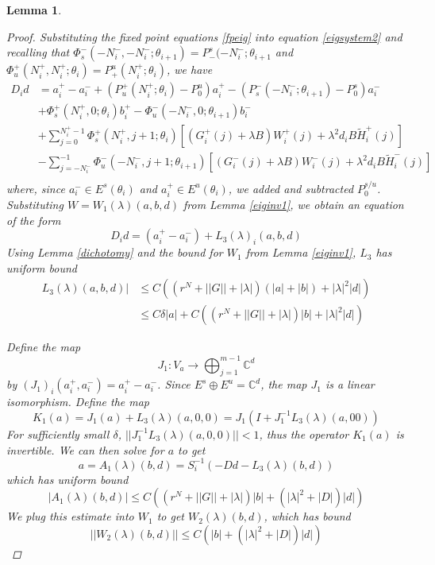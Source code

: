 \documentclass[12pt]{article}
\def\C{{\mathbb C}}
\newtheorem{lemma}{Lemma}
\begin{document}
\begin{lemma}
\begin{proof}
Substituting the fixed point equations \eqref{fpeig} into equation \eqref{eigsystem2} and recalling that $\Phi_s^-(-N_i^-, -N_i^-; \theta_{i+1}) = P_-^s(-N_i^-; \theta_{i+1}$ and $\Phi_u^+(N_i^+, N_i^+; \theta_i) = P_+^u(N_i^+; \theta_{i})$, we have
\begin{align}
D_i d &= a_i^+ - a_i^- + (P_u^+(N_i^+; \theta_i) - P_0^u) a_i^+ - (P_s^-(-N_i^-; \theta_{i+1}) - P_0^s) a_i^- \\
&+ \Phi_s^+(N_i^+, 0; \theta_i) b_i^+ - \Phi_u^-(-N_i^-, 0; \theta_{i+1}) b_i^- \nonumber \\
&+ \sum_{j = 0}^{N_i^+-1} \Phi_s^+(N_i^+, j+1; \theta_i) 
[(G_i^+(j) + \lambda B) W_i^+(j) + \lambda^2 d_i B \tilde{H}_i^+(j)] \nonumber \\
&- \sum_{j = -N_i^-}^{-1} \Phi_u^-(-N_i^-, j+1; \theta_{i+1}) 
[(G_i^-(j) + \lambda B) W_i^-(j) + \lambda^2 d_i B \tilde{H}_i^-(j)] \nonumber \\
\end{align}
where, since $a_i^- \in E^s(\theta_i)$ and $a_i^+ \in E^u(\theta_i)$, we added and subtracted $P_0^{s/u}$. Substituting $W = W_1(\lambda)(a, b, d)$ from Lemma \ref{eiginv1}, we obtain an equation of the form 
\begin{equation}\label{Dideq}
D_i d = (a_i^+ - a_i^-) + L_3(\lambda)_i(a,b,d)
\end{equation}
Using Lemma \ref{dichotomy} and the bound for $W_1$ from Lemma \ref{eiginv1}, $L_3$ has uniform bound
\begin{align}\label{L3bound}
L_3(\lambda)(a,b,d)| &\leq C\left( (r^N + ||G|| + |\lambda| ) (|a| + |b|) + |\lambda|^2 |d|  \right) \\
&\leq C \delta |a| + C\left( (r^N + ||G|| + |\lambda| ) |b| + |\lambda|^2 |d|  \right) \nonumber
\end{align}

Define the map
\[
J_1: V_a \rightarrow \bigoplus_{j=1}^{m-1} \C^d
\]
by $(J_1)_i(a_i^+, a_i^-) = a_i^+ - a_i^-$. Since $E^s \oplus E^u = \C^d$, the map $J_1$ is a linear isomorphism. Define the map
\[
K_1(a) = J_1 (a) + L_3(\lambda)(a, 0, 0) = J_1( I + J_1^{-1} L_3(\lambda)(a, 0 0) )
\]
For sufficiently small $\delta$, $||J_1^{-1} L_3(\lambda)(a, 0, 0)|| < 1$, thus the operator $K_1(a)$ is invertible. We can then solve for $a$ to get
\[
a = A_1(\lambda)(b, d) = S_i^{-1}(-D d - L_3(\lambda)(b, d))
\]
which has uniform bound
\begin{equation*}
|A_1(\lambda)(b, d)| \leq C \left( (r^N + ||G|| + |\lambda| ) |b| + (|\lambda|^2 + |D| ) |d|  \right)
\end{equation*}
We plug this estimate into $W_1$ to get $W_2(\lambda)(b,d)$, which has bound
\begin{equation*}
||W_2(\lambda)(b,d)|| \leq C \left( |b| + (|\lambda|^2 + |D|) |d| \right)
\end{equation*}


\end{proof}
\end{lemma}
\end{document}
